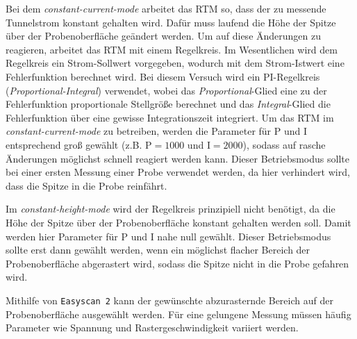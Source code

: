 Bei dem \textit{constant-current-mode} arbeitet das RTM so, dass der zu messende Tunnelstrom konstant gehalten wird. Dafür muss laufend die Höhe der Spitze
über der Probenoberfläche geändert werden. Um auf diese Änderungen zu reagieren, arbeitet das RTM mit einem Regelkreis. Im Wesentlichen wird dem Regelkreis
ein Strom-Sollwert vorgegeben, wodurch mit dem Strom-Istwert eine Fehlerfunktion berechnet wird. Bei diesem Versuch wird ein PI-Regelkreis (\textit{Proportional-Integral}) verwendet,
wobei das \textit{Proportional}-Glied eine zu der Fehlerfunktion proportionale Stellgröße berechnet und das \textit{Integral}-Glied die Fehlerfunktion über eine gewisse
Integrationszeit integriert. Um das RTM im \textit{constant-current-mode} zu betreiben, werden die Parameter für P und I entsprechend groß gewählt (z.B. $\mathrm{P} = 1000$ und $\mathrm{I} = 2000$),
sodass auf rasche Änderungen möglichst schnell reagiert werden kann. Dieser Betriebsmodus sollte bei einer ersten Messung einer Probe verwendet werden, da hier verhindert wird,
dass die Spitze in die Probe reinfährt.\par
Im \textit{constant-height-mode} wird der Regelkreis prinzipiell nicht benötigt, da die Höhe der Spitze über der Probenoberfläche konstant gehalten werden soll.
Damit werden hier Parameter für P und I nahe null gewählt. Dieser Betriebsmodus sollte erst dann gewählt werden, wenn ein möglichst flacher Bereich der Probenoberfläche abgerastert wird,
sodass die Spitze nicht in die Probe gefahren wird.\par
Mithilfe von \texttt{Easyscan 2} kann der gewünschte abzurasternde Bereich auf der Probenoberfläche ausgewählt werden. Für eine gelungene Messung müssen häufig Parameter wie Spannung
und Rastergeschwindigkeit variiert werden.